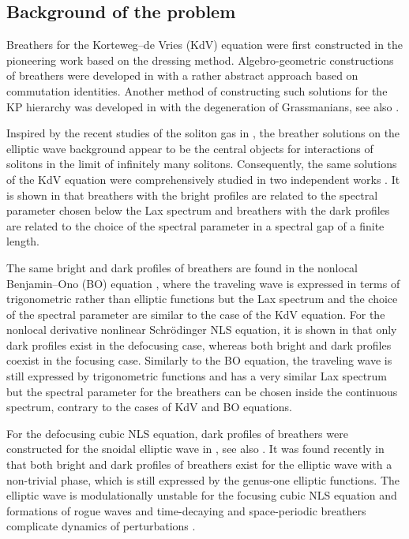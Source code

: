 \documentclass[12pt,reqno]{amsart}
\numberwithin{equation}{section}
\begin{document}
\subsection{Background of the problem}

Breathers for the Korteweg--de Vries (KdV) equation were first constructed in the pioneering work \cite{KM74} based on the dressing method. Algebro-geometric constructions of breathers were developed in \cite{GS95} with a rather abstract approach based on commutation identities. Another method of constructing such solutions for the KP hierarchy was developed in \cite{BEN20,Nak} with the degeneration of Grassmanians, see also \cite{LiZhang}.
 
Inspired by the recent studies of the soliton gas in \cite{Congy,Girotti,Grava}, the breather solutions on the elliptic wave background appear to be the central objects for interactions of solitons in the limit of infinitely many solitons. Consequently, the same solutions of the KdV equation were comprehensively studied in two independent works \cite{Bertola,HMP23}. It is shown in \cite{HMP23} that breathers with the bright profiles are related to the spectral parameter chosen below the Lax spectrum and breathers with the dark profiles are related to the choice of the spectral parameter in a spectral gap of a finite length. 

The same bright and dark profiles of breathers are found in the nonlocal Benjamin--Ono (BO) equation \cite{ChenPel24}, where the traveling wave is expressed in terms of trigonometric rather than elliptic functions but the Lax spectrum and the choice of the spectral parameter are similar to the case of the KdV equation. For the nonlocal derivative nonlinear Schr\"{o}dinger NLS equation, it is shown in \cite{ChenPel25} that only dark profiles exist in the defocusing case, whereas both bright and dark profiles coexist in the focusing case. Similarly to the BO equation, the traveling wave is still expressed by trigonometric functions and has a very similar Lax spectrum but the spectral parameter for the breathers can be chosen inside the continuous spectrum, contrary to the cases of KdV and BO equations. 

For the defocusing cubic NLS equation, dark profiles of breathers 
were constructed for the snoidal elliptic wave in  \cite{Shin,Takahashi}, see also \cite{Ling}. It was found recently in \cite{Sun} 
that both bright and dark profiles of breathers exist for the elliptic 
wave with a non-trivial phase, which is still expressed by the genus-one elliptic 
functions.  The elliptic wave is modulationally unstable for the focusing cubic NLS equation and formations of rogue waves and time-decaying and space-periodic breathers complicate dynamics of perturbations \cite{Biondini2,CPW,Feng}.
\end{document}
